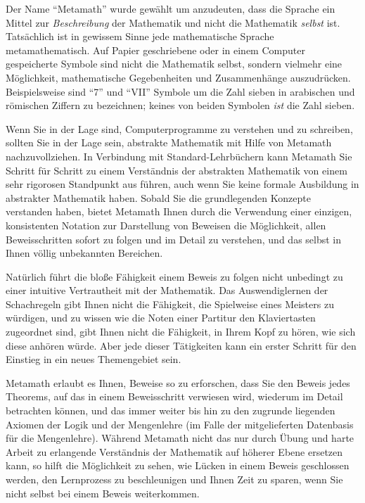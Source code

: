 Der Name "`Metamath"' wurde gewählt um anzudeuten, dass die Sprache ein Mittel zur {\em Beschreibung} der Mathematik und nicht die Mathematik {\em selbst} ist. Tatsächlich ist in gewissem Sinne jede mathematische Sprache metamathematisch. Auf Papier geschriebene oder in einem Computer gespeicherte Symbole sind nicht die Mathematik selbst, sondern vielmehr eine Möglichkeit, mathematische Gegebenheiten und Zusammenhänge auszudrücken. Beispielsweise sind "`7"' und "`VII"' Symbole um die Zahl sieben in arabischen und römischen Ziffern zu bezeichnen; keines von beiden Symbolen {\em ist} die Zahl sieben.

Wenn Sie in der Lage sind, Computerprogramme zu verstehen und zu schreiben, sollten Sie in der Lage sein, abstrakte Mathematik mit Hilfe von Metamath nachzuvollziehen. In Verbindung mit Standard-Lehrbüchern kann Metamath Sie Schritt für Schritt zu einem Verständnis der abstrakten Mathematik von einem sehr rigorosen Standpunkt aus führen, auch wenn Sie keine formale Ausbildung in abstrakter Mathematik haben. Sobald Sie die grundlegenden Konzepte verstanden haben, bietet Metamath Ihnen durch die Verwendung einer einzigen, konsistenten Notation zur Darstellung von Beweisen die Möglichkeit, allen Beweisschritten sofort zu folgen und im Detail zu verstehen, und das selbst in Ihnen völlig unbekannten Bereichen.

Natürlich führt die bloße Fähigkeit einem Beweis zu folgen nicht unbedingt zu einer intuitive Vertrautheit mit der Mathematik. Das Auswendiglernen der Schachregeln gibt Ihnen nicht die Fähigkeit, die Spielweise eines Meisters zu würdigen, und zu wissen wie die Noten einer Partitur den Klaviertasten zugeordnet sind, gibt Ihnen nicht die Fähigkeit, in Ihrem Kopf zu hören, wie sich diese anhören würde. Aber jede dieser Tätigkeiten kann ein erster Schritt für den Einstieg in ein neues Themengebiet sein.

Metamath erlaubt es Ihnen, Beweise so zu erforschen, dass Sie den Beweis jedes Theorems, auf das in einem Beweisschritt verwiesen wird, wiederum im Detail betrachten können, und das immer weiter bis hin zu den zugrunde liegenden Axiomen der Logik und der Mengenlehre (im Falle der mitgelieferten Datenbasis für die Mengenlehre). Während Metamath nicht das nur durch Übung und harte Arbeit zu erlangende Verständnis der Mathematik auf höherer Ebene ersetzen kann, so hilft die Möglichkeit zu sehen, wie Lücken in einem Beweis geschlossen werden, den Lernprozess zu beschleunigen und Ihnen Zeit zu sparen, wenn Sie nicht selbst bei einem Beweis weiterkommen.

